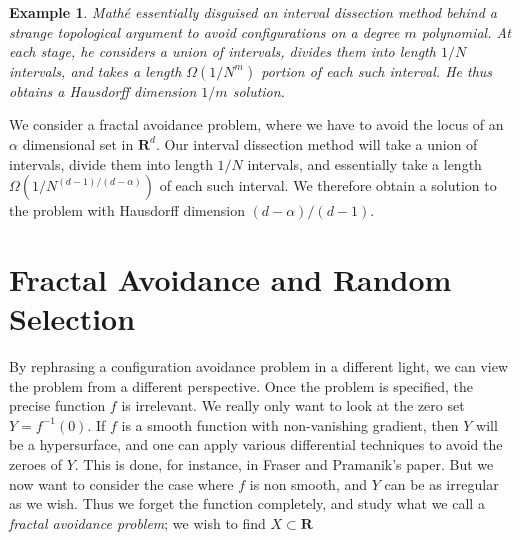 \documentclass{report}
\theoremstyle{plain}
\newtheorem*{example}{Example}
\theoremstyle{plain}
\begin{document}
\begin{example}
    Math\'{e} essentially disguised an interval dissection method behind a strange topological argument to avoid configurations on a degree $m$ polynomial. At each stage, he considers a union of intervals, divides them into length $1/N$ intervals, and takes a length $\Omega(1/N^m)$ portion of each such interval. He thus obtains a Hausdorff dimension $1/m$ solution.
\end{example}

We consider a fractal avoidance problem, where we have to avoid the locus of an $\alpha$ dimensional set in $\mathbf{R}^d$. Our interval dissection method will take a union of intervals, divide them into length $1/N$ intervals, and essentially take a length $\Omega(1/N^{(d-1)/(d-\alpha)})$ of each such interval. We therefore obtain a solution to the problem with Hausdorff dimension $(d-\alpha)/(d-1)$.

\section{Fractal Avoidance and Random Selection}

By rephrasing a configuration avoidance problem in a different light, we can view the problem from a different perspective. Once the problem is specified, the precise function $f$ is irrelevant. We really only want to look at the zero set $Y = f^{-1}(0)$. If $f$ is a smooth function with non-vanishing gradient, then $Y$ will be a hypersurface, and one can apply various differential techniques to avoid the zeroes of $Y$. This is done, for instance, in Fraser and Pramanik's paper. But we now want to consider the case where $f$ is non smooth, and $Y$ can be as irregular as we wish. Thus we forget the function completely, and study what we call a {\it fractal avoidance problem}; we wish to find $X \subset \mathbf{R}$
\end{document}
